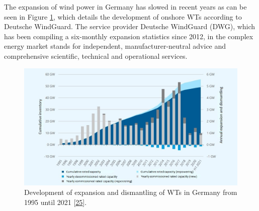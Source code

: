 \documentclass[a4paper,11pt]{article}
\begin{document}
The expansion of wind power in Germany has slowed in recent years as can be seen in Figure \ref{fig:winddevelopment}, which details the development of onshore WTs according to Deutsche WindGuard. The service provider Deutsche WindGuard (DWG), which has been compiling a six-monthly expansion statistics since 2012, in the complex energy market stands for independent, manufacturer-neutral advice and comprehensive scientific, technical and operational services.


\begin{figure}

{\centering \includegraphics[width=1\linewidth]{figures/wind2} 

}

\caption{Development of expansion and dismantling of WTs in Germany from 1995 until 2021 {[}\protect\hyperlink{ref-DeutscheWindGuard.2021}{25}{]}.}\label{fig:winddevelopment}
\end{figure}
\end{document}
